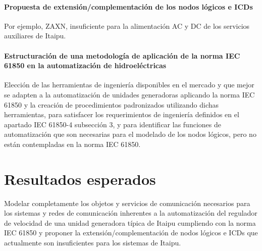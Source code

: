 \documentclass[conference,twocolumn]{IEEEtran}
\begin{document}
	\paragraph{Propuesta de extensi\'on/complementaci\'on de los nodos l\'ogicos e ICDs}
		Por ejemplo, ZAXN, insuficiente para la alimentaci\'on AC y DC de los servicios auxiliares de Itaipu.
	\paragraph{Estructuraci\'on de una metodolog\'ia de aplicaci\'on de la norma IEC 61850 en la automatizaci\'on de hidroel\'ectricas}
		Elecci\'on de las herramientas de ingenier\'ia disponibles en el mercado y que mejor se adapten a la automatizaci\'on de unidades generadoras aplicando la norma IEC 61850 y la creaci\'on de procedimientos padronizados utilizando dichas herramientas, para satisfacer los requerimientos de ingenier\'ia definidos en el apartado IEC 61850-4 subsecci\'on 3, y para identificar las funciones de automatizaci\'on que son necesarias para el modelado de los nodos l\'ogicos, pero no est\'an contempladas en la norma IEC 61850.







\section {Resultados esperados}
Modelar completamente los objetos y servicios de comunicación necesarios para los sistemas y redes de comunicación inherentes a la automatizaci\'on del regulador de velocidad de una unidad generadora t\'ipica de Itaipu cumpliendo con la norma IEC 61850 y proponer la extensi\'on/complementaci\'on de nodos l\'ogicos e ICDs que actualmente son insuficientes para los sistemas de Itaipu.
\end{document}
